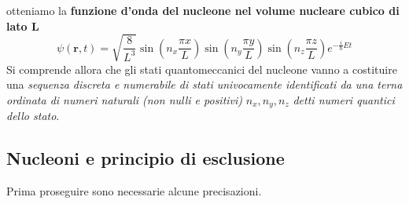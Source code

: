 otteniamo la \textbf{funzione d’onda del nucleone nel volume nucleare cubico di lato L}
\begin{equation}
	\psi(\bm{r},t) = \sqrt{ \frac{8}{L^{3}}} \sin\left( n_{x} \frac{\pi x}{L} \right) \sin\left( n_{y} \frac{\pi y}{L} \right)
	\sin\left( n_{z} \frac{\pi z}{L} \right) e^{ -\frac{i}{\hslash}Et }
	\label{eq:wave-function-nucleon-fermion-gas-normalized}
\end{equation}
Si comprende allora che gli stati quantomeccanici del nucleone vanno a costituire una \emph{sequenza discreta e numerabile di stati univocamente identificati da una terna ordinata di numeri naturali (non nulli e positivi)} $n_x, n_y, n_z$  \emph{detti numeri quantici dello stato}.

\subsection{Nucleoni e principio di esclusione} \label{sec:nucleoni-principio-di-esclusione}
%
%
%
%
Prima proseguire sono necessarie alcune precisazioni.
